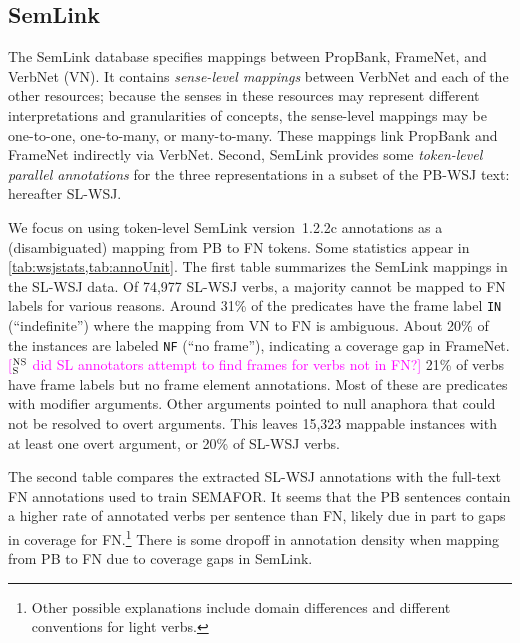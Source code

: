 \documentclass[11pt]{article}
\newcommand{\ensuretext}[1]{#1}
\newcommand{\nssmarker}{\ensuretext{\textcolor{magenta}{\ensuremath{^{\textsc{NS}}_{\textsc{S}}}}}}
\newcommand{\arkcomment}[3]{\ensuretext{\textcolor{#3}{[#1 #2]}}}
\newcommand{\nss}[1]{\arkcomment{\nssmarker}{#1}{magenta}}
\begin{document}
\subsection{SemLink}\label{sec:semlink}

The SemLink database \citep{semlink} specifies mappings between PropBank, FrameNet, and VerbNet (VN). 
It contains \emph{sense-level mappings} between VerbNet and each of the other resources; 
because the senses in these resources may represent different interpretations and granularities of concepts, 
the sense-level mappings may be one-to-one, one-to-many, or many-to-many.
These mappings link PropBank and FrameNet indirectly via VerbNet. %
Second, SemLink provides some \emph{token-level parallel annotations} 
for the three representations in a subset of the PB-WSJ text: hereafter SL-WSJ.

We focus on using token-level SemLink version~1.2.2c annotations as a (disambiguated) mapping from PB to FN tokens.
Some statistics appear in \cref{tab:wsjstats,tab:annoUnit}. The first table summarizes the SemLink mappings in the SL-WSJ data. 
Of 74,977 SL-WSJ verbs, a majority cannot be mapped to FN labels for various reasons. 
Around 31\% of the predicates have the frame label \texttt{IN} (``indefinite'') where the mapping from VN to FN is ambiguous. 
About 20\% of the instances are labeled \texttt{NF} (``no frame''), indicating a coverage gap in FrameNet.\nss{did SL annotators attempt to find frames for verbs not in FN?}
21\% of verbs have frame labels but no frame element annotations. 
Most of these are predicates with modifier arguments. 
Other arguments pointed to null anaphora that could not be resolved to overt arguments.
This leaves 15,323 mappable instances with at least one overt argument, or 20\% of SL-WSJ verbs.

The second table compares the extracted SL-WSJ annotations with the full-text FN annotations used to train SEMAFOR. 
It seems that the PB sentences contain a higher rate of annotated verbs per sentence than FN, 
likely due in part to gaps in coverage for FN.\footnote{Other possible explanations include domain differences and different conventions for light verbs.}
There is some dropoff in annotation density when mapping from PB to FN due to coverage gaps in SemLink.
\end{document}
